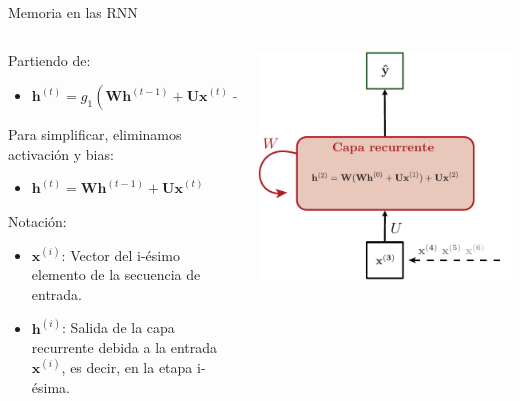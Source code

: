 \documentclass[aspectratio=169]{beamer}
\begin{document}
\begin{frame}{Memoria en las RNN}

	\begin{columns}
		\begin{column}{0.5\textwidth}
			Partiendo de:
			\begin{itemize}
				\item $\mathbf{h}^{(t)} = g_{1}(\mathbf{Wh}^{(t-1)}+\mathbf{Ux}^{(t)}+\mathbf{b}_{h})$
			\end{itemize}			
			Para simplificar, eliminamos activación y bias:
			\begin{itemize}
				\item $\mathbf{h}^{(t)} = \mathbf{Wh}^{(t-1)}+\mathbf{Ux}^{(t)}$
			\end{itemize}
			\vspace{1em}
			Notación:
			\begin{itemize}
			  \item $\mathbf{x}^{(i)}$: Vector del i-ésimo elemento de la secuencia de entrada.
			  \item $\mathbf{h}^{(i)}$: Salida de la capa recurrente debida a la entrada $\mathbf{x}^{(i)}$, es decir, en la etapa i-ésima.
			\end{itemize}
		\end{column}

		\begin{column}{0.5\textwidth}
			\begin{center}
				\includegraphics[width=.8\textwidth]{imgs/tema4/rnn/Memoria3.pdf}
			\end{center}
		\end{column}
	\end{columns}

\end{frame}
\end{document}
